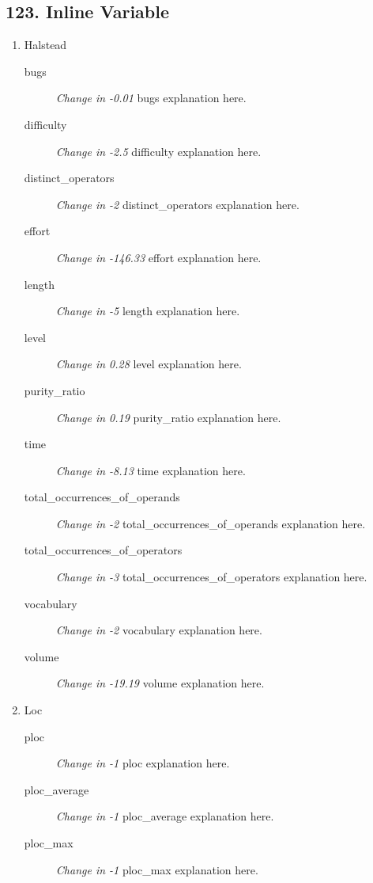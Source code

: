 \subsection{ 123.  Inline Variable }

\begin{enumerate}
      \item Halstead
            \begin{description}
                  \item [bugs] \textit{Change in -0.01} bugs explanation here.
                  \item [difficulty] \textit{Change in -2.5} difficulty explanation here.
                  \item [distinct\_operators] \textit{Change in -2} distinct\_operators explanation here.
                  \item [effort] \textit{Change in -146.33} effort explanation here.
                  \item [length] \textit{Change in -5} length explanation here.
                  \item [level] \textit{Change in 0.28} level explanation here.
                  \item [purity\_ratio] \textit{Change in 0.19} purity\_ratio explanation here.
                  \item [time] \textit{Change in -8.13} time explanation here.
                  \item [total\_occurrences\_of\_operands] \textit{Change in -2} total\_occurrences\_of\_operands explanation here.
                  \item [total\_occurrences\_of\_operators] \textit{Change in -3} total\_occurrences\_of\_operators explanation here.
                  \item [vocabulary] \textit{Change in -2} vocabulary explanation here.
                  \item [volume] \textit{Change in -19.19} volume explanation here.
            \end{description}
      \item Loc
            \begin{description}
                  \item [ploc] \textit{Change in -1} ploc explanation here.
                  \item [ploc\_average] \textit{Change in -1} ploc\_average explanation here.
                  \item [ploc\_max] \textit{Change in -1} ploc\_max explanation here.

\end{description}
\end{enumerate}
